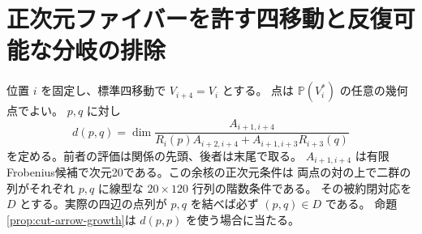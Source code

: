 \section{正次元ファイバーを許す四移動と反復可能な分岐の排除}
\label{sec:recurrent-point-correspondences}
位置 $i$ を固定し、標準四移動で $V_{i+4}=V_i$ とする。
点は $\mathbb P(V_i^*)$ の任意の幾何点でよい。
$p,q$ に対し
\[
 d(p,q)=\dim\frac{A_{i+1,i+4}}
 {R_i(p) A_{i+2,i+4}+A_{i+1,i+3}R_{i+3}(q)}
\]
を定める。前者の評価は関係の先頭、後者は末尾で取る。
$A_{i+1,i+4}$ は有限Frobenius候補で次元20である。この余核の正次元条件は
両点の対の上で二群の列がそれぞれ $p,q$ に線型な $20\times120$ 行列の階数条件である。
その被約閉対応を $D$ とする。実際の四辺の点列が $p,q$ を結べば必ず $(p,q)\in D$ である。
命題\ref{prop:cut-arrow-growth}は $d(p,p)$ を使う場合に当たる。

